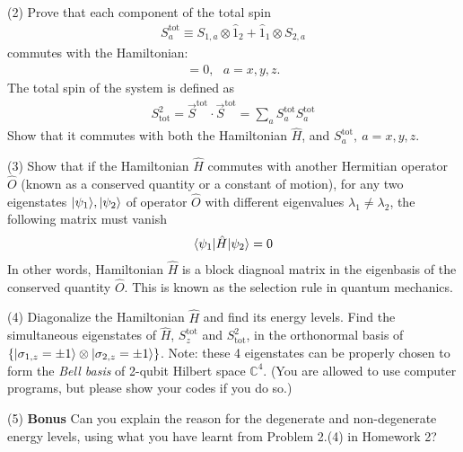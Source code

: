 (2) Prove that each component of the total spin
\begin{align}
S^\text{tot}_a\equiv S_{1,a}\otimes\hat 1_2+\hat 1_1\otimes S_{2,a}
\end{align}
commutes with the Hamiltonian:
\begin{align}
[S^\text{tot}_a,\hat H]=0,~~~a=x,y,z.
\end{align}
The total spin of the system is defined as 
\begin{align}
S^2_\text{tot}=\vec S^\text{tot}\cdot\vec S^\text{tot}=\sum_aS^\text{tot}_aS^\text{tot}_a
\end{align}
Show that it commutes with both the Hamiltonian $\hat H$, and $S^\text{tot}_a,~a=x,y,z$.

(3) Show that if the Hamiltonian $\hat H$ commutes with another Hermitian operator $\hat O$ (known as a conserved quantity or a constant of motion), for any two eigenstates $|{\psi_1}\rangle,|{\psi_2}\rangle$ of operator $\hat O$ with different eigenvalues $\lambda_1\neq\lambda_2$, the following matrix must vanish
\begin{align}
\langle{\psi_1|\hat H|\psi_2}\rangle=0
\end{align}
In other words, Hamiltonian $\hat H$ is a block diagnoal matrix in the eigenbasis of the conserved quantity $\hat O$. This is known as the selection rule in quantum mechanics. 

(4) Diagonalize the Hamiltonian $\hat H$ and find its energy levels. Find the simultaneous eigenstates of $\hat H$, $S^\text{tot}_z$ and $S^2_\text{tot}$, in the orthonormal basis of $\{|{\sigma_{1,z}=\pm1}\rangle\otimes|{\sigma_{2,z}=\pm1}\rangle\}$. Note: these 4 eigenstates can be properly chosen to form the \emph{Bell basis} of 2-qubit Hilbert space $\mathbb{C}^4$. (You are allowed to use computer programs, but please show your codes if you do so.)

(5) \textbf{Bonus} Can you explain the reason for the degenerate and non-degenerate energy levels, using what you have learnt from Problem 2.(4) in Homework 2?
